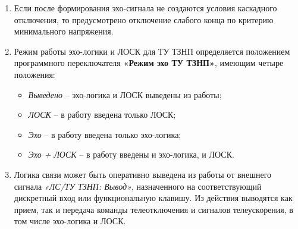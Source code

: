 \begin{enumerate}
\begin{enumerate}
\item
Если после формирования эхо-сигнала не создаются условия каскадного отключения, то предусмотрено отключение слабого конца по критерию минимального напряжения.

\item
Режим работы эхо-логики и ЛОСК для ТУ ТЗНП определяется положением программного переключателя \textbf{«Режим эхо ТУ ТЗНП»}, имеющим четыре положения:

\begin{itemize}
    \item   \textit{Выведено} -- эхо-логика и ЛОСК выведены из работы;
    \item   \textit{ЛОСК} -- в работу введена только ЛОСК;	
    \item   \textit{Эхо} -- в работу введена только эхо-логика;
    \item   \textit{Эхо + ЛОСК} -- в работу введены и эхо-логика, и ЛОСК.
\end{itemize}

\item
Логика связи может быть оперативно выведена из работы от внешнего сигнала \textit{«ЛС/ТУ ТЗНП: Вывод»}, назначенного на соответствующий дискретный вход или функциональную клавишу. Из действия выводятся как прием, так и передача команды телеотключения и сигналов телеускорения, в том числе эхо-логика и ЛОСК. 

\end{enumerate}

\end{enumerate}